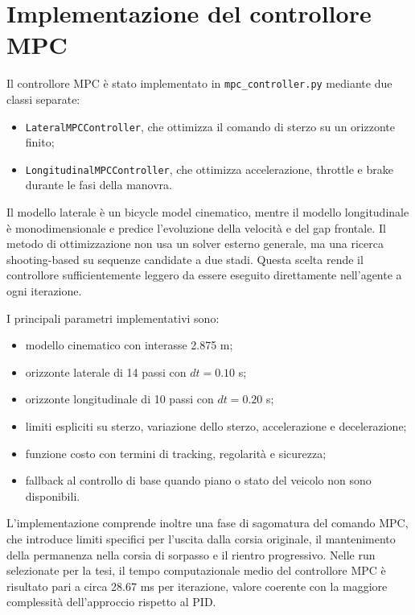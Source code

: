 \section{Implementazione del controllore MPC}

Il controllore MPC è stato implementato in \texttt{mpc\_controller.py} mediante due classi separate:

\begin{itemize}
    \item \texttt{LateralMPCController}, che ottimizza il comando di sterzo su un orizzonte finito;
    \item \texttt{LongitudinalMPCController}, che ottimizza accelerazione, throttle e brake durante le fasi della manovra.
\end{itemize}

Il modello laterale è un bicycle model cinematico, mentre il modello longitudinale è monodimensionale e predice l'evoluzione della velocità e del gap frontale. Il metodo di ottimizzazione non usa un solver esterno generale, ma una ricerca shooting-based su sequenze candidate a due stadi. Questa scelta rende il controllore sufficientemente leggero da essere eseguito direttamente nell'agente a ogni iterazione.

I principali parametri implementativi sono:

\begin{itemize}
    \item modello cinematico con interasse 2.875 m;
    \item orizzonte laterale di 14 passi con \(dt = 0.10\) s;
    \item orizzonte longitudinale di 10 passi con \(dt = 0.20\) s;
    \item limiti espliciti su sterzo, variazione dello sterzo, accelerazione e decelerazione;
    \item funzione costo con termini di tracking, regolarità e sicurezza;
    \item fallback al controllo di base quando piano o stato del veicolo non sono disponibili.
\end{itemize}

L'implementazione comprende inoltre una fase di sagomatura del comando MPC, che introduce limiti specifici per l'uscita dalla corsia originale, il mantenimento della permanenza nella corsia di sorpasso e il rientro progressivo. Nelle run selezionate per la tesi, il tempo computazionale medio del controllore MPC è risultato pari a circa 28.67 ms per iterazione, valore coerente con la maggiore complessità dell'approccio rispetto al PID.
